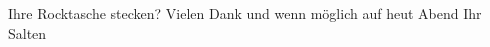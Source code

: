 \begin{ledgroupsized}[t]{13cm}
               Ihre Rocktasche stecken?\pend
           \pstart
           Vielen Dank und wenn möglich auf heut{ }Abend\pend
           \pstart Ihr \spacefill\mbox{Salten}\pend{}
         
         \endnumbering{}\end{ledgroupsized}  \newcommand{\dateiname}{L03275}\newcommand{\titel}{Felix Salten an Arthur Schnitzler, [30.? 11. 1897]}\newcommand{\editorInnen}{Martin Anton Müller und Laura Untner}
      